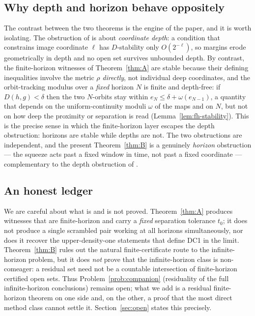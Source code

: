 \documentclass[11pt]{article}
\begin{document}
\subsection*{Why depth and horizon behave oppositely}

The contrast between the two theorems is the engine of the paper, and it is worth
isolating.  The obstruction of \cite{companion} is about \emph{coordinate depth}: a
condition that constrains image coordinate $\ell$ has $D$-stability only $O(2^{-\ell})$,
so margins erode geometrically in depth and no open set survives unbounded depth.  By
contrast, the finite-horizon witnesses of Theorem~\ref{thm:A} are stable because their
defining inequalities involve the metric $\rho$ \emph{directly}, not individual deep
coordinates, and the orbit-tracking modulus over a \emph{fixed} horizon $N$ is finite
and depth-free: if $D(h,g)<\delta$ then the two $N$-orbits stay within
$e_N\le\delta+\omega(e_{N-1})$, a quantity that depends on the uniform-continuity moduli
$\omega$ of the maps and on $N$, but not on how deep the proximity or separation is read
(Lemma~\ref{lem:fh-stability}).  This is the precise sense in which the finite-horizon
layer escapes the depth obstruction: horizons are stable while depths are not.  The two
obstructions are independent, and the present Theorem~\ref{thm:B} is a genuinely
\emph{horizon} obstruction --- the squeeze acts past a fixed window in time, not past a
fixed coordinate --- complementary to the depth obstruction of \cite{companion}.

\subsection*{An honest ledger}

We are careful about what is and is not proved.  Theorem~\ref{thm:A} produces witnesses
that are finite-horizon and carry a \emph{fixed} separation tolerance $t_0$; it does not
produce a single scrambled pair working at all horizons simultaneously, nor does it
recover the upper-density-one statements that define DC1 in the limit.  Theorem~\ref{thm:B}
rules out the natural finite-certificate route to the infinite-horizon problem, but it
does \emph{not} prove that the infinite-horizon class is non-comeager: a residual set
need not be a countable intersection of finite-horizon certified open sets.  Thus
Problem~\ref{prob:companion} (residuality of the full infinite-horizon conclusions)
remains open; what we add is a residual finite-horizon theorem on one side and, on the
other, a proof that the most direct method class cannot settle it.  Section~\ref{sec:open}
states this precisely.
\end{document}
